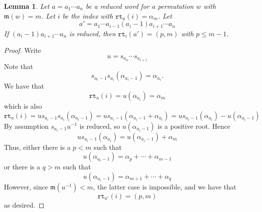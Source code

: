 \documentclass{amsart}
\newtheorem{lemma}{Lemma}[subsection]
\theoremstyle{definition}
\theoremstyle{remark}
\numberwithin{equation}{subsection}
\newcommand{\wof}[1]{w_{#1}}
\newcommand{\rtt}{\mathtt{rt}}
\newcommand{\trm}{\mathtt{trim}}
\newcommand{\hr}{\mathtt{ht}}
\newcommand{\maxd}{\mathfrak{m}}
\begin{document}


\begin{lemma} \label{lemma:mroot}
Let $a=a_1\cdots a_n$ be a reduced word for a permutation $w$ with $\maxd(w) = m$. Let $i$ be the index with $\rtt_a(i) = \alpha_m$. Let
$$a' = a_1\cdots a_{i-1}(a_i - 1)a_{i+1}\cdots a_n$$
If $(a_{i} - 1)a_{i+1}\cdots a_n$ is reduced, then $\rtt_i(a') = (p,m)$ with $p\leq m - 1$.
\end{lemma}
\begin{proof}
Write
$$u = s_{a_n}\cdots s_{a_{i+1}}$$
Note that
$$s_{a_i - 1}s_{a_i}(\alpha_{a_i - 1}) = \alpha_{a_i}.$$
We have that
$$\rtt_a(i) = u(\alpha_{a_i}) = \alpha_m$$
which is also
$$\rtt_a(i) = us_{a_i - 1}s_{a_i}(\alpha_{a_i - 1})=us_{a_i - 1}(\alpha_{a_i - 1}+\alpha_{a_i}) = us_{a_i - 1}(\alpha_{a_i}) -u(\alpha_{a_i - 1})$$
By assumption $s_{a_i - 1}u^{-1}$ is reduced, so $u(\alpha_{a_i - 1})$ is a positive root. Hence
$$us_{a_i - 1}(\alpha_{a_i}) = u(\alpha_{a_i - 1}) + \alpha_m$$
Thus, either there is a $p < m$ such that
$$u(\alpha_{a_i - 1}) = \alpha_p+\cdots+\alpha_{m-1}$$
or there is a $q>m$ such that
$$u(\alpha_{a_i - 1}) = \alpha_{m + 1}+\cdots+\alpha_q$$
However, since $\maxd(u^{-1})<m$, the latter case is impossible, and we have that
$$\rtt_{a'}(i) = (p, m)$$
as desired.
\end{proof}
\end{document}
